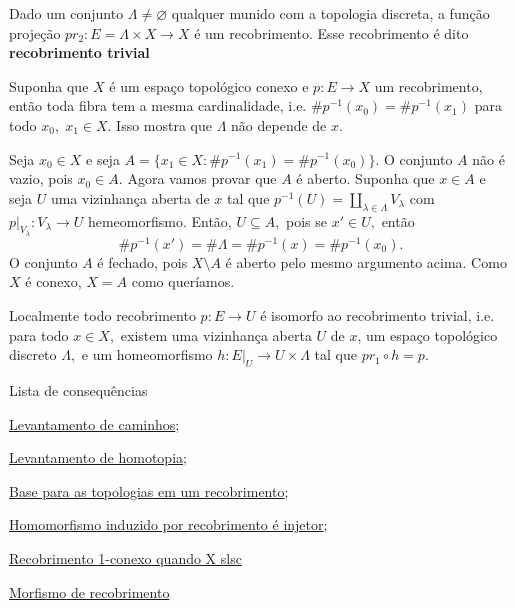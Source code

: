 \begin{ex}
    Dado um conjunto $\Lambda\ne \varnothing$ qualquer munido com a topologia discreta, a função projeção $pr_2:E=\Lambda\times X\rightarrow X$ é um recobrimento. Esse recobrimento é dito \textbf{recobrimento trivial}
\end{ex}

\begin{prop}
    Suponha que $X$ é um espaço topológico conexo e $p:E\rightarrow X$ um recobrimento, então toda fibra tem a mesma cardinalidade, i.e. $\# p^{-1}(x_0)=\# p^{-1}(x_1)$ para todo $x_0,\;x_1\in X.$ Isso mostra que $\Lambda$ não depende de $x$.
\end{prop}

\begin{dem}
    Seja $x_0\in X$ e seja $A=\{x_1\in X: \#p^{-1}(x_1)=\# p^{-1}(x_0)\}.$ O conjunto $A$ não é vazio, pois $x_0\in A.$ Agora vamos provar que $A$ é aberto. Suponha que $x\in A$ e seja $U$ uma vizinhança aberta de $x$ tal que $p^{-1}(U)=\amalg_{\lambda\in \Lambda} V_\lambda$ com $p|_{V_\lambda}:V_\lambda\rightarrow U$ hemeomorfismo. Então, $U\subseteq A,$ pois se $x'\in U,$ então 
    $$\# p^{-1}(x')=\# \Lambda=\# p^{-1}(x)=\# p^{-1}(x_0).$$
    O conjunto $A$ é fechado, pois $X\setminus A$ é aberto pelo mesmo argumento acima. Como $X$ é conexo, $X=A$ como queríamos. 
\end{dem}

\begin{nota}
    Localmente todo recobrimento $p:E\rightarrow U$ é isomorfo ao recobrimento trivial, i.e. para todo $x\in X,$ existem uma vizinhança aberta $U$ de $x$, um espaço topológico discreto $\Lambda,$ e um homeomorfismo $h: E|_U\rightarrow U\times \Lambda$ tal que $pr_1\circ h= p.$
\end{nota}

\begin{titlemize}{Lista de consequências}
	\item \hyperref[levantamento-de-caminhos-prop]{Levantamento de caminhos};\\ %
	\item \hyperref[levantamento-de-homotopia-prop]{Levantamento de homotopia};\\
 	\item \hyperref[base-para-topologias-em-recobrimento-prop]{Base para as topologias em um recobrimento};\\
  	\item \hyperref[homomorfismo-induzido-por-recobrimento-prop]{Homomorfismo induzido por recobrimento é injetor};\\
   	\item \hyperref[recobrimento-1-conexo-prop]{Recobrimento 1-conexo quando X slsc}
        \item \hyperref[morfismo-de-recobrimento-def]{Morfismo de recobrimento}
\end{titlemize}
